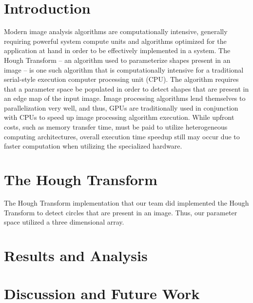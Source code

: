 \documentclass[conference]{IEEEtran}
\begin{document}
\section*{Introduction}
Modern image analysis algorithms are computationally intensive, generally requiring powerful system compute units and algorithms optimized for the application at hand in order to be effectively implemented in a system. The Hough Transform \~\cite{BALLARD1981111} – an algorithm used to parameterize shapes present in an image – is one such algorithm that is computationally intensive for a traditional serial-style execution computer processing unit (CPU). The algorithm requires that a parameter space be populated in order to detect shapes that are present in an edge map of the input image. Image processing algorithms lend themselves to parallelization very well, and thus, GPUs are traditionally used in conjunction with CPUs to speed up image processing algorithm execution. While upfront costs, such as memory transfer time, must be paid to utilize heterogeneous computing architectures, overall execution time speedup still may occur due to faster computation when utilizing the specialized hardware.


\section{The Hough Transform}
The Hough Transform implementation that our team did implemented the Hough Transform to detect circles that are present in an image. Thus, our parameter space utilized a three dimensional array. 

\section{Results and Analysis}

\section{Discussion and Future Work}





% 

\end{document}
